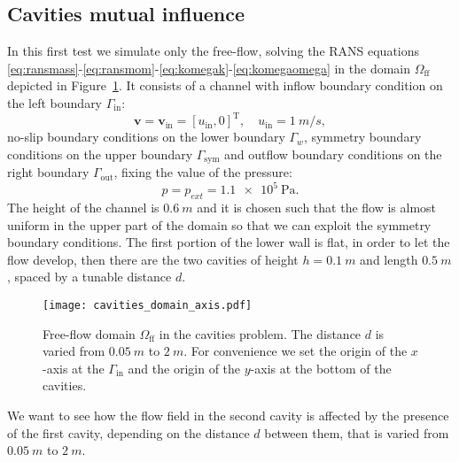 \subsection{Cavities mutual influence}
In this first test we simulate only the free-flow, solving the RANS equations  \eqref{eq:ransmass}-\eqref{eq:ransmom}-\eqref{eq:komegak}-\eqref{eq:komegaomega} in the domain $\Omega_\text{ff}$ depicted in Figure~\ref{fig:singledomain}. It consists of a channel with inflow boundary 
condition on the left boundary $\Gamma_\text{in}$:
\begin{equation}
	\mathbf{v} = \mathbf{v}_\text{in} = [u_\text{in}, 0]^\mathrm{T}, \quad u_\text{in} = \SI{1}{m/s},
\end{equation}
no-slip boundary conditions on the lower boundary $\Gamma_w$, symmetry boundary conditions on the upper boundary $\Gamma_\text{sym}$ and outflow boundary conditions on the right boundary $\Gamma_\text{out}$, fixing the value of the pressure:
\begin{equation}
	p = p_{ext} = \SI{1.1e5}{\pascal}.
\end{equation}
The height of the channel is $\SI{0.6}{m}$ and it is chosen such that the flow is almost uniform in the upper part of the domain so that we can exploit the symmetry boundary conditions. The first portion of the lower wall is flat, in order to let the flow develop, then there are the two cavities of height $h=\SI{0.1}{m}$ and length $\SI{0.5}{m}$, spaced by a tunable distance $d$.
\begin{figure}[ht]
	\centering
	\texttt{[image: cavities\_domain\_axis.pdf]}
	\caption[Free-flow domain $\Omega_\text{ff}$ in the cavities problem]{Free-flow domain $\Omega_\text{ff}$ in the cavities problem. The distance $d$ is varied from $\SI{0.05}{m}$ to $\SI{2}{m}$. For convenience we set the origin of the $x$-axis at the $\Gamma_\text{in}$ and the origin of the $y$-axis at the bottom of the cavities.}
	\label{fig:singledomain}
\end{figure}

We want to see how the flow field in the second cavity is affected by the 
presence of the first cavity, depending on the distance $d$ between them, that 
is varied from $\SI{0.05}{m}$ to $\SI{2}{m}$.

